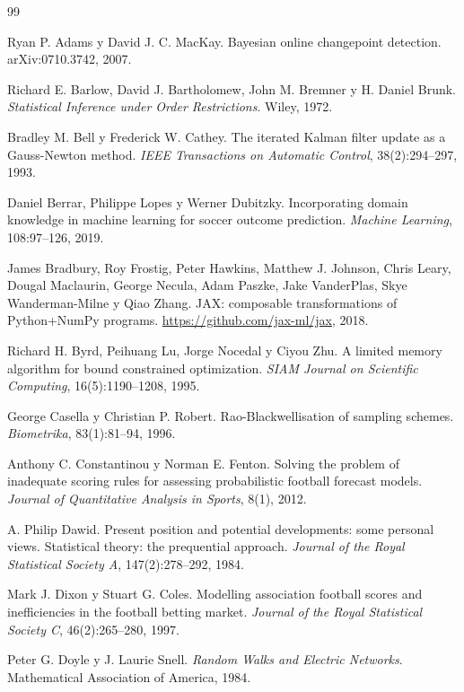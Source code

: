 \begin{thebibliography}{99}
\small

 Ryan P. Adams y David J. C. MacKay. Bayesian online changepoint detection. arXiv:0710.3742, 2007.

 Richard E. Barlow, David J. Bartholomew, John M. Bremner y H. Daniel Brunk. \emph{Statistical Inference under Order Restrictions}. Wiley, 1972.

 Bradley M. Bell y Frederick W. Cathey. The iterated Kalman filter update as a Gauss-Newton method. \emph{IEEE Transactions on Automatic Control}, 38(2):294--297, 1993.

 Daniel Berrar, Philippe Lopes y Werner Dubitzky. Incorporating domain knowledge in machine learning for soccer outcome prediction. \emph{Machine Learning}, 108:97--126, 2019.

 James Bradbury, Roy Frostig, Peter Hawkins, Matthew J. Johnson, Chris Leary, Dougal Maclaurin, George Necula, Adam Paszke, Jake VanderPlas, Skye Wanderman-Milne y Qiao Zhang. JAX: composable transformations of Python+NumPy programs. \url{https://github.com/jax-ml/jax}, 2018.

 Richard H. Byrd, Peihuang Lu, Jorge Nocedal y Ciyou Zhu. A limited memory algorithm for bound constrained optimization. \emph{SIAM Journal on Scientific Computing}, 16(5):1190--1208, 1995.

 George Casella y Christian P. Robert. Rao-Blackwellisation of sampling schemes. \emph{Biometrika}, 83(1):81--94, 1996.

 Anthony C. Constantinou y Norman E. Fenton. Solving the problem of inadequate scoring rules for assessing probabilistic football forecast models. \emph{Journal of Quantitative Analysis in Sports}, 8(1), 2012.

 A. Philip Dawid. Present position and potential developments: some personal views. Statistical theory: the prequential approach. \emph{Journal of the Royal Statistical Society A}, 147(2):278--292, 1984.

 Mark J. Dixon y Stuart G. Coles. Modelling association football scores and inefficiencies in the football betting market. \emph{Journal of the Royal Statistical Society C}, 46(2):265--280, 1997.

 Peter G. Doyle y J. Laurie Snell. \emph{Random Walks and Electric Networks}. Mathematical Association of America, 1984.


\end{thebibliography}
